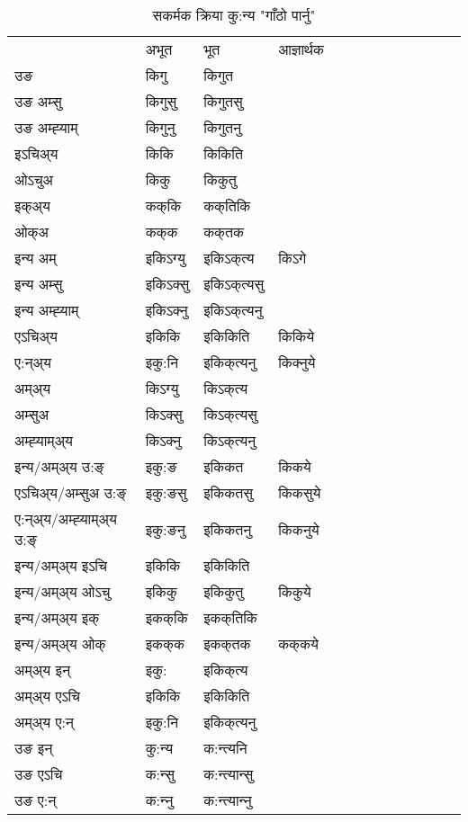 \begin{table}[H]
\label{ik.vt} \centering
\caption{सकर्मक क्रिया  कु:न्य  "गाँठो पार्नु"  }
\begin{tabular}{l|l|l|l|l|l|l|l|l|l|l|l|l}  \toprule
&अभूत & भूत & आज्ञार्थक \\ 
उङ &किगु &किगुत \\ 
उङ अम्सु &किगुसु &किगुतसु \\ 
उङ अम्ह्‍याम् &किगुनु &किगुतनु \\ 
इऽचिअ्य &किकि &किकिति   \\ 
ओऽचुअ &किकु &किकुतु   \\ 
इक्अ्य &कक्‌कि &कक्‌तिकि   \\ 
ओक्अ &कक्‌क &कक्‌तक   \\ 
इन्य अम् & इकिऽग्यु  & इकिऽक्‌त्य &किऽगे  \\ 
इन्य अम्सु & इकिऽक्सु  & इकिऽक्‌त्यसु   \\ 
इन्य अम्ह्‍याम् & इकिऽक्‍नु  & इकिऽक्‌त्यनु   \\ 
एऽचिअ्य & इकिकि & इकिकिति &किकिये    \\ 
ए:न्अ्य & इकु:नि  & इकिक्‌त्यनु &किक्‍नुये  \\ 
अम्अ्य & किऽग्यु  & किऽक्‌त्य  \\ 
अम्सुअ & किऽक्सु & किऽक्‌त्यसु  \\ 
अम्ह्‍याम्अ्य & किऽक्‍नु  & किऽक्‌त्यनु \\ 
\midrule
इन्य/अम्अ्य उ:ङ्‌&इकु:ङ & इकिकत &किकये \\ 
एऽचिअ्य/अम्सुअ उ:ङ्‌ &इकु:ङसु & इकिकतसु &किकसुये \\ 
ए:न्अ्य/अम्ह्‍याम्अ्य उ:ङ्‌ &इकु:ङनु & इकिकतनु &किकनुये \\ 
इन्य/अम्अ्य इऽचि & इकिकि & इकिकिति    \\ 
इन्य/अम्अ्य ओऽचु & इकिकु & इकिकुतु  &किकुये  \\ 
इन्य/अम्अ्य इक् & इकक्‌कि & इकक्‌तिकि   \\ 
इन्य/अम्अ्य ओक् & इकक्‌क & इकक्‌तक  &कक्‌कये  \\ 
अम्अ्य इन् & इकु: & इकिक्‌त्य   \\ 
अम्अ्य एऽचि & इकिकि & इकिकिति    \\ 
अम्अ्य ए:न् & इकु:नि  & इकिक्‌त्यनु  \\ 
\midrule
उङ इन् & कु:न्य  & क:न्त्यनि  \\ 
उङ एऽचि & क:न्सु  & क:न्त्यान्सु   \\ 
उङ ए:न्& क:न्‍नु  & क:न्त्यान्‍नु   \\ 
\bottomrule
\end{tabular}
\end{table}


